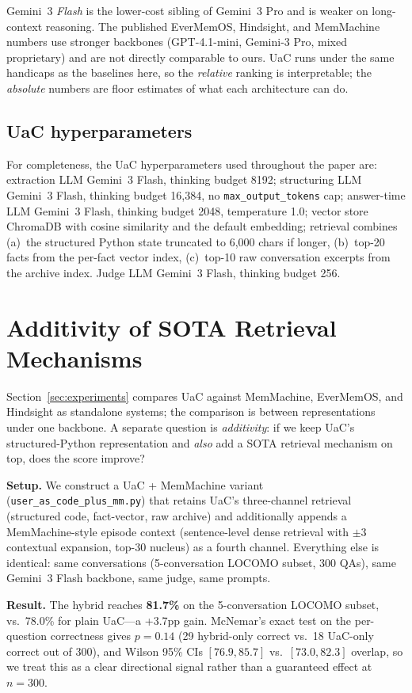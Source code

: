 Gemini~3 \emph{Flash} is the lower-cost sibling of Gemini~3 Pro and is weaker on long-context reasoning. The published EverMemOS, Hindsight, and MemMachine numbers use stronger backbones (GPT-4.1-mini, Gemini-3 Pro, mixed proprietary) and are not directly comparable to ours. UaC runs under the same handicaps as the baselines here, so the \emph{relative} ranking is interpretable; the \emph{absolute} numbers are floor estimates of what each architecture can do.

\subsection{UaC hyperparameters}

For completeness, the UaC hyperparameters used throughout the paper are: extraction LLM Gemini~3 Flash, thinking budget 8192; structuring LLM Gemini~3 Flash, thinking budget 16{,}384, no \texttt{max\_output\_tokens} cap; answer-time LLM Gemini~3 Flash, thinking budget 2048, temperature 1.0; vector store ChromaDB with cosine similarity and the default embedding; retrieval combines (a)~the structured Python state truncated to 6{,}000 chars if longer, (b)~top-20 facts from the per-fact vector index, (c)~top-10 raw conversation excerpts from the archive index. Judge LLM Gemini~3 Flash, thinking budget 256.


\section{Additivity of SOTA Retrieval Mechanisms}
\label{app:additivity}

Section~\ref{sec:experiments} compares UaC against MemMachine, EverMemOS, and Hindsight as standalone systems; the comparison is between representations under one backbone. A separate question is \emph{additivity}: if we keep UaC's structured-Python representation and \emph{also} add a SOTA retrieval mechanism on top, does the score improve?

\textbf{Setup.} We construct a UaC + MemMachine variant (\texttt{user\_as\_code\_plus\_mm.py}) that retains UaC's three-channel retrieval (structured code, fact-vector, raw archive) and additionally appends a MemMachine-style episode context (sentence-level dense retrieval with $\pm 3$ contextual expansion, top-30 nucleus) as a fourth channel. Everything else is identical: same conversations (5-conversation LOCOMO subset, 300 QAs), same Gemini~3 Flash backbone, same judge, same prompts.

\textbf{Result.} The hybrid reaches \textbf{81.7\%} on the 5-conversation LOCOMO subset, vs.\ 78.0\% for plain UaC---a +3.7pp gain. McNemar's exact test on the per-question correctness gives $p{=}0.14$ (29 hybrid-only correct vs.\ 18 UaC-only correct out of 300), and Wilson 95\% CIs $[76.9, 85.7]$ vs.\ $[73.0, 82.3]$ overlap, so we treat this as a clear directional signal rather than a guaranteed effect at $n{=}300$.

